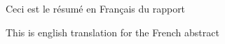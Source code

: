 \begin{resumefr}

Ceci est le résumé en Français du rapport
	

\end{resumefr}

\begin{resumeen}

This is english translation for the French abstract


\end{resumeen}